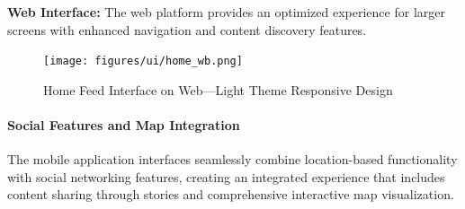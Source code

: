 \textbf{Web Interface:}
The web platform provides an optimized experience for larger screens with enhanced navigation and content discovery features.

\begin{figure}[!htbp]
    \centering
    \texttt{[image: figures/ui/home\_wb.png]}
    \caption{Home Feed Interface on Web---Light Theme Responsive Design}
    \label{fig:web_home}
\end{figure}

\paragraph{Social Features and Map Integration}
The mobile application interfaces seamlessly combine location-based functionality with social networking features, creating an integrated experience that includes content sharing through stories and comprehensive interactive map visualization.

